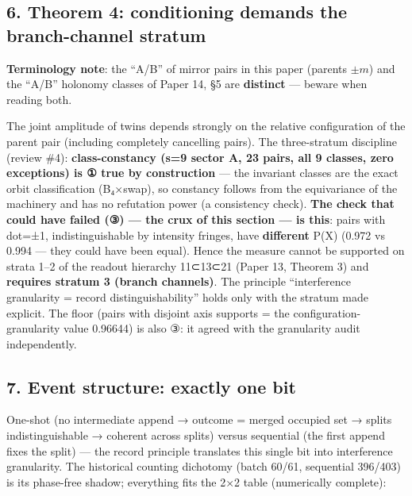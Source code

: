 \documentclass[
]{ltjsarticle}
\begin{document}
\subsection{6. Theorem 4: conditioning demands the branch-channel
stratum}\label{theorem-4-conditioning-demands-the-branch-channel-stratum}

\textbf{Terminology note}: the ``A/B'' of mirror pairs in this paper
(parents \(\pm m\)) and the ``A/B'' holonomy classes of Paper 14, §5 are
\textbf{distinct} --- beware when reading both.

The joint amplitude of twins depends strongly on the relative
configuration of the parent pair (including completely cancelling
pairs). The three-stratum discipline (review \#4):
\textbf{class-constancy (s=9 sector A, 23 pairs, all 9 classes, zero
exceptions) is ① true by construction} --- the invariant classes are the
exact orbit classification (B₄×swap), so constancy follows from the
equivariance of the machinery and has no refutation power (a consistency
check). \textbf{The check that could have failed (③) --- the crux of
this section --- is this}: pairs with dot=±1, indistinguishable by
intensity fringes, have \textbf{different} P(X) (0.972 vs 0.994 --- they
could have been equal). Hence the measure cannot be supported on strata
1--2 of the readout hierarchy 11⊂13⊂21 (Paper 13, Theorem 3) and
\textbf{requires stratum 3 (branch channels)}. The principle
``interference granularity = record distinguishability'' holds only with
the stratum made explicit. The floor (pairs with disjoint axis supports
= the configuration-granularity value 0.96644) is also ③: it agreed with
the granularity audit independently.

\subsection{7. Event structure: exactly one
bit}\label{event-structure-exactly-one-bit}

One-shot (no intermediate append → outcome = merged occupied set →
splits indistinguishable → coherent across splits) versus sequential
(the first append fixes the split) --- the record principle translates
this single bit into interference granularity. The historical counting
dichotomy (batch 60/61, sequential 396/403) is its phase-free shadow;
everything fits the 2×2 table (numerically complete):
\end{document}
